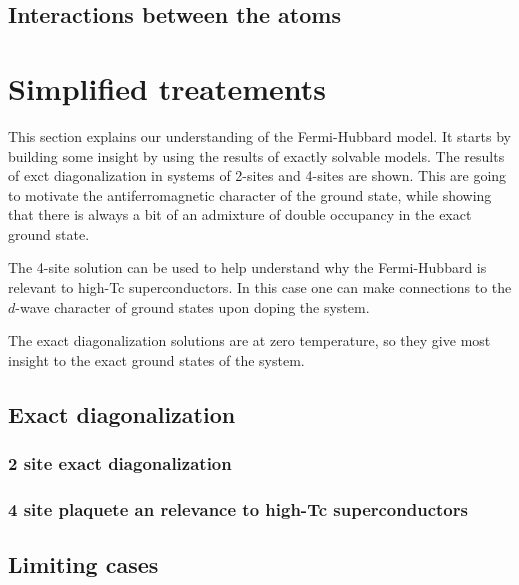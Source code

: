\documentclass[oneside,11pt]{memoir}
\begin{document}
 

























\subsection{ Interactions between the atoms }  

\section{Simplified treatements}


This section explains our understanding of the Fermi-Hubbard model.  It starts
by building some insight by using the results of exactly solvable models.   The
results of exct diagonalization in systems of 2-sites and 4-sites are shown.
This are going to motivate the antiferromagnetic character of the ground state,
while showing that there is always a bit of an admixture of double occupancy in
the exact ground state.  

The 4-site solution can be used to help understand why the Fermi-Hubbard is relevant to high-Tc superconductors.   In this case one can make connections to the $d$-wave character of ground states upon doping the system.   

The exact diagonalization solutions are at zero temperature, so they give most
insight to the exact ground states of the system. 

\subsection{ Exact diagonalization } 
\subsubsection { 2 site exact diagonalization } 
\subsubsection { 4 site plaquete an relevance to high-Tc superconductors}

\subsection{ Limiting cases} 
\end{document}
